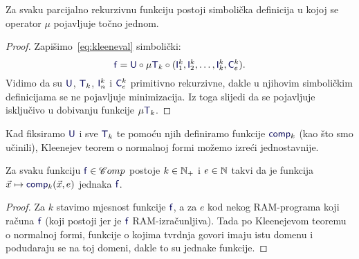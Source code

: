 \begin{korolar}[{name=[jedna minimizacija je dovoljna]}]
Za svaku parcijalno rekurzivnu funkciju postoji simbolička definicija \newline u kojoj se operator $\mu$ pojavljuje točno jednom.
\end{korolar}
\begin{proof}
Zapišimo~\eqref{eq:kleeneval} simbolički:
\begin{equation}
    \f f=\f U\circ\mu\f T_k\circ(\f I_1^k,\f I_2^k,\dotsc,\f I_k^k,\f C_e^k)\text.
\end{equation}
Vidimo da su $\f U$, $\f T_k$, $\f I_n^k$ i $\f C_e^k$ primitivno rekurzivne, dakle u njihovim simboličkim definicijama se ne pojavljuje minimizacija. Iz toga slijedi da se pojavljuje isključivo u dobivanju funkcije $\mu\f T_k$.
\end{proof}



Kad fiksiramo $\f U$ i sve $\f T_k$ te pomoću njih definiramo funkcije $\f{comp}_k$ (kao što smo učinili), Kleenejev teorem o normalnoj formi možemo izreći jednostavnije.

\begin{korolar}[{name=[svaka izračunljiva funkcija je specijalizacija univerzalne]}]\label{kor:pimi}
Za svaku funkciju $\f f\in\mathscr Comp$ postoje $k\in{\mathbb N}_+$ i $e\in{\mathbb N}$ takvi da je funkcija $\vec x\mapsto\f{comp}_k(\vec x,e)$ jednaka $\f f$.
\end{korolar}

\begin{proof}
Za $k$ stavimo mjesnost funkcije $\f f$, a za $e$ kod nekog RAM-programa koji računa $\f f$ (koji postoji jer je $\f f$ RAM-izračunljiva). Tada po Kleenejevom teoremu o normalnoj formi, funkcije o kojima tvrdnja govori imaju istu domenu i podudaraju se na toj domeni, dakle to su jednake funkcije.
\end{proof}


